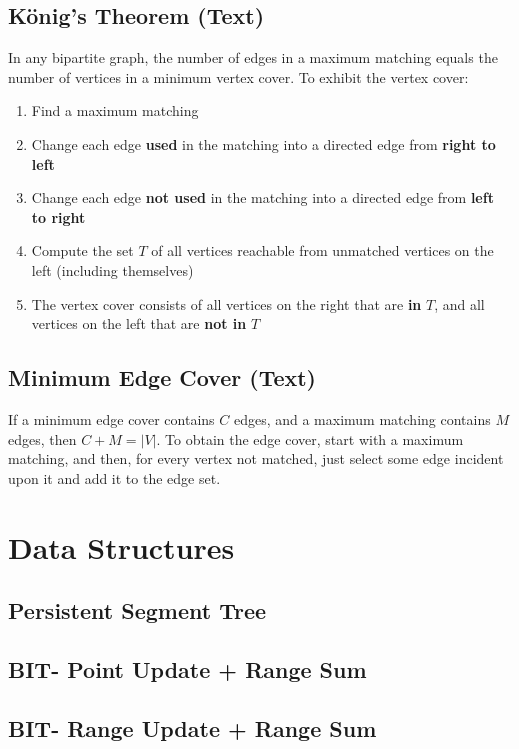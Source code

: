 \documentclass[12pt]{extarticle}
\begin{document}
\begin{multicols*}{2}
\subsection{K\"onig's Theorem (Text)} %
In any bipartite graph, the number of edges in a maximum matching equals the
number of vertices in a minimum vertex cover. To exhibit the vertex cover:
\begin{enumerate}
\item Find a maximum matching
\item Change each edge \textbf{used} in the matching into a directed edge from
\textbf{right to left}
\item Change each edge \textbf{not used} in the matching into a directed edge
from \textbf{left to right}
\item Compute the set $T$ of all vertices reachable from unmatched vertices on
the left (including themselves)
\item The vertex cover consists of all vertices on the right that are
\textbf{in} $T$, and all vertices on the left that are \textbf{not in} $T$
\end{enumerate}

\subsection{Minimum Edge Cover (Text)} %
If a minimum edge cover contains $C$ edges, and a maximum matching contains $M$
edges, then $C + M = |V|$. To obtain the edge cover, start with a maximum
matching, and then, for every vertex not matched, just select some edge
incident upon it and add it to the edge set. 


\section{Data Structures}

\subsection{Persistent Segment Tree} %


\subsection{BIT- Point Update + Range Sum} %


\subsection{BIT- Range Update + Range Sum} %



\end{multicols*}
\end{document}
